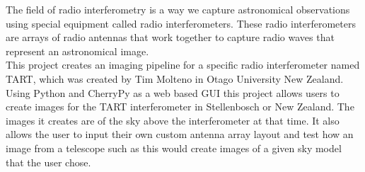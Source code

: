 The field of radio interferometry is a way we capture astronomical observations using special equipment called radio interferometers. These radio interferometers are arrays of radio antennas that work together to capture radio waves that represent an astronomical image.\cite{DefinitionInterferometer}\cite{DefinitionInterferometer2} \\
This project creates an imaging pipeline for a specific radio interferometer named TART, which was created by Tim Molteno in Otago University New Zealand. Using Python and CherryPy\cite{Cherrypy} as a web based GUI this project allows users to create images for the TART interferometer in Stellenbosch or New Zealand. The images it creates are of the sky above the interferometer at that time. It also allows the user to input their own custom antenna array layout and test how an image from a telescope such as this would create images of a given sky model that the user chose.